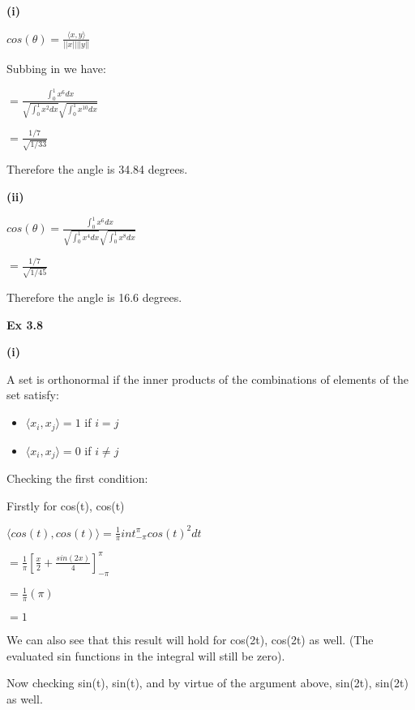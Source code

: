 \documentclass[letterpaper,12pt]{article}
\theoremstyle{definition}
\begin{document}
\begin{spacing}{1.3}{}
	\textbf{(i)}
	
	\setlength{\leftskip}{20pt}
	
	$cos(\theta) = \frac{\langle x, y \rangle}{||x|| ||y||}$
	
	Subbing in we have:
	
	$= \frac{\int_{0}^{1} x^6 dx}{\sqrt{\int_{0}^{1} x^2 dx}\sqrt{\int_{0}^{1} x^10 dx}}$
	
	$= \frac{1/7}{\sqrt{1/33}}$
	
	Therefore the angle is 34.84 degrees.
	
	\setlength{\leftskip}{10pt}
	
	\textbf{(ii)}
	
	\setlength{\leftskip}{20pt}
	
	$cos(\theta) = \frac{\int_{0}^{1}x^6 dx}{\sqrt{\int_{0}^{1}x^4 dx}\sqrt{\int_{0}^{1}x^8 dx}}$
	
	$= \frac{1/7}{\sqrt{1/45}}$
	
	Therefore the angle is 16.6 degrees.
	
	\setlength{\leftskip}{0pt}
	
	\textbf{Ex 3.8}
	
	\setlength{\leftskip}{10pt}
	
	\textbf{(i)}
	
	\setlength{\leftskip}{20pt}
	
	A set is orthonormal if the inner products of the combinations of elements of the set satisfy: \begin{itemize} \item $\langle x_{i}, x_{j} \rangle = 1$ if $i=j$ \item $\langle x_{i}, x_{j} \rangle = 0$ if $i \neq j$ \end{itemize}
	
	Checking the first condition:
	
	Firstly for cos(t), cos(t)
	
	$\langle cos(t), cos(t) \rangle = \frac{1}{\pi}int_{-\pi}^{\pi} cos(t)^2 dt$
	
	$= \frac{1}{\pi}[\frac{x}{2} + \frac{sin(2x)}{4}]_{-\pi}^{\pi}$
	
	$= \frac{1}{\pi}(\pi)$
	
	$=1$
	
	We can also see that this result will hold for cos(2t), cos(2t) as well. (The evaluated sin functions in the integral will still be zero).
	
	Now checking sin(t), sin(t), and by virtue of the argument above, sin(2t), sin(2t) as well.
	

\end{spacing}
\end{document}
